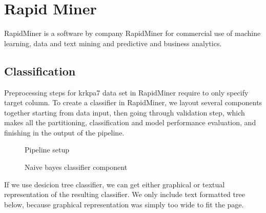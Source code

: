 \documentclass[11pt]{article}
\begin{document}
\clearpage
\section{Rapid Miner}
RapidMiner is a software by company RapidMiner for commercial use of machine learning, data and text mining and predictive and business analytics.

\subsection{Classification}
Preprocessing steps for krkpa7 data set in RapidMiner require to only specify
target column.  To create a classifier in RapidMiner, we layout several
components together starting from data input, then going through validation
step, which makes all the partitioning, classification and model performance
evaluation, and finishing in the output of the pipeline.

\begin{figure}[!ht]
	\centering
    \caption{Pipeline setup}
\end{figure}

\begin{figure}[!ht]
	\centering
    \caption{Naive bayes classifier component}
\end{figure}

If we use desicion tree classifier, we can get either graphical or textual
representation of the resulting classifier. We only include text formatted tree
below, because graphical representation was simply too wide to fit the page.
\end{document}
